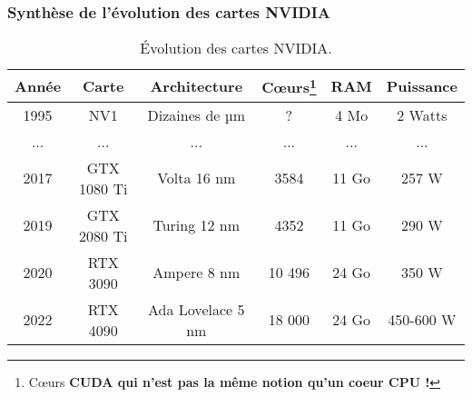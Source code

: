 \begin{frame}
  \frametitle{Synthèse de l'évolution des cartes NVIDIA}
\begin{table}
\footnotesize  \centering
            \begin{tabular}{cccccc}
            \rowcolor{lightgray}\textbf{Année} & \textbf{Carte} & \textbf{Architecture} & \textbf{Cœurs\footnote{\tiny Cœurs \bf{CUDA} qui n'est pas la même notion qu'un coeur CPU !}} & \textbf{RAM} & \textbf{Puissance} \\\hline
            1995 & NV1 & Dizaines de µm & ?  & 4 Mo & 2 Watts \\
            ... & ... & ...  & ... & ... & ...\\
    
            2017 & GTX 1080 Ti & Volta 16 nm & 3584 & 11 Go & 257 W \\
            2019 & GTX 2080 Ti & Turing 12 nm & 4352 & 11 Go & 290 W \\
            2020 & RTX 3090 & Ampere 8 nm & 10 496 & 24 Go & 350 W \\

            2022 & RTX 4090 & Ada Lovelace 5 nm & 18 000  & 24 Go & 450-600 W \\ 
            \end{tabular}
          \caption{Évolution des cartes NVIDIA.}\label{tab:evo_nvidia}
          \end{table}
\end{frame}
